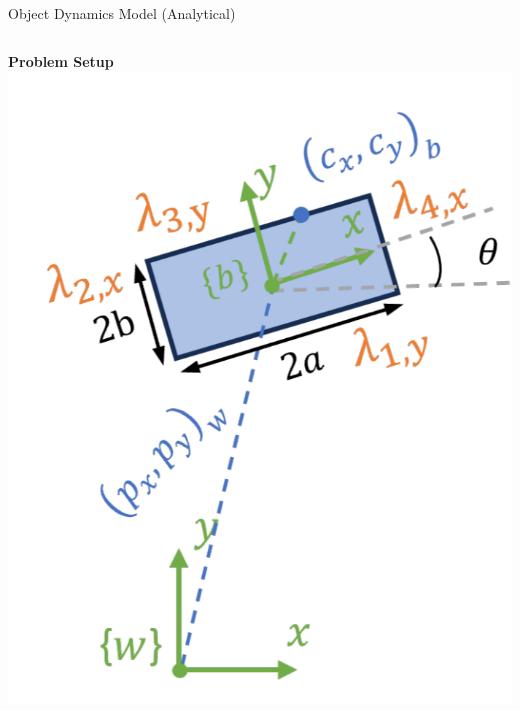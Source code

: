\documentclass[10pt, aspectratio=169]{beamer}
\begin{document}
\begin{frame}{Object Dynamics Model (Analytical)}
\begin{columns}[T,onlytextwidth]
    \begin{column}{0.28\textwidth}
      \centering
      {\bfseries Problem Setup}\footnotemark\\[0.5em]
      \includegraphics[width=\textwidth]{Figures/pushbox_crisp_example_analytical.png}
    \end{column}
  \end{columns}

\end{frame}
\end{document}
